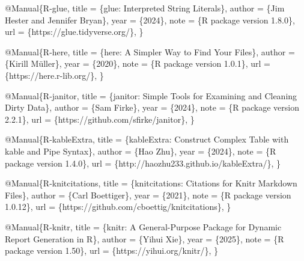 \documentclass[
]{article}
\newenvironment{Shaded}{\begin{snugshade}}{\end{snugshade}}
\newcommand{\DataTypeTok}[1]{\textcolor[rgb]{0.13,0.29,0.53}{#1}}
\newcommand{\NormalTok}[1]{#1}
\newcommand{\OtherTok}[1]{\textcolor[rgb]{0.56,0.35,0.01}{#1}}
\newcommand{\VariableTok}[1]{\textcolor[rgb]{0.00,0.00,0.00}{#1}}
\begin{document}
\begin{Shaded}
\begin{Highlighting}[]
\VariableTok{@Manual}\NormalTok{\{}\OtherTok{R}\NormalTok{{-}}\OtherTok{glue}\NormalTok{,}
  \DataTypeTok{title}\NormalTok{ = \{glue: Interpreted String Literals\},}
  \DataTypeTok{author}\NormalTok{ = \{Jim Hester and Jennifer Bryan\},}
  \DataTypeTok{year}\NormalTok{ = \{2024\},}
  \DataTypeTok{note}\NormalTok{ = \{R package version 1.8.0\},}
  \DataTypeTok{url}\NormalTok{ = \{https://glue.tidyverse.org/\},}
\NormalTok{\}}

\VariableTok{@Manual}\NormalTok{\{}\OtherTok{R}\NormalTok{{-}}\OtherTok{here}\NormalTok{,}
  \DataTypeTok{title}\NormalTok{ = \{here: A Simpler Way to Find Your Files\},}
  \DataTypeTok{author}\NormalTok{ = \{Kirill Müller\},}
  \DataTypeTok{year}\NormalTok{ = \{2020\},}
  \DataTypeTok{note}\NormalTok{ = \{R package version 1.0.1\},}
  \DataTypeTok{url}\NormalTok{ = \{https://here.r{-}lib.org/\},}
\NormalTok{\}}

\VariableTok{@Manual}\NormalTok{\{}\OtherTok{R}\NormalTok{{-}}\OtherTok{janitor}\NormalTok{,}
  \DataTypeTok{title}\NormalTok{ = \{janitor: Simple Tools for Examining and Cleaning Dirty Data\},}
  \DataTypeTok{author}\NormalTok{ = \{Sam Firke\},}
  \DataTypeTok{year}\NormalTok{ = \{2024\},}
  \DataTypeTok{note}\NormalTok{ = \{R package version 2.2.1\},}
  \DataTypeTok{url}\NormalTok{ = \{https://github.com/sfirke/janitor\},}
\NormalTok{\}}

\VariableTok{@Manual}\NormalTok{\{}\OtherTok{R}\NormalTok{{-}}\OtherTok{kableExtra}\NormalTok{,}
  \DataTypeTok{title}\NormalTok{ = \{kableExtra: Construct Complex Table with kable and Pipe Syntax\},}
  \DataTypeTok{author}\NormalTok{ = \{Hao Zhu\},}
  \DataTypeTok{year}\NormalTok{ = \{2024\},}
  \DataTypeTok{note}\NormalTok{ = \{R package version 1.4.0\},}
  \DataTypeTok{url}\NormalTok{ = \{http://haozhu233.github.io/kableExtra/\},}
\NormalTok{\}}

\VariableTok{@Manual}\NormalTok{\{}\OtherTok{R}\NormalTok{{-}}\OtherTok{knitcitations}\NormalTok{,}
  \DataTypeTok{title}\NormalTok{ = \{knitcitations: Citations for Knitr Markdown Files\},}
  \DataTypeTok{author}\NormalTok{ = \{Carl Boettiger\},}
  \DataTypeTok{year}\NormalTok{ = \{2021\},}
  \DataTypeTok{note}\NormalTok{ = \{R package version 1.0.12\},}
  \DataTypeTok{url}\NormalTok{ = \{https://github.com/cboettig/knitcitations\},}
\NormalTok{\}}

\VariableTok{@Manual}\NormalTok{\{}\OtherTok{R}\NormalTok{{-}}\OtherTok{knitr}\NormalTok{,}
  \DataTypeTok{title}\NormalTok{ = \{knitr: A General{-}Purpose Package for Dynamic Report Generation in R\},}
  \DataTypeTok{author}\NormalTok{ = \{Yihui Xie\},}
  \DataTypeTok{year}\NormalTok{ = \{2025\},}
  \DataTypeTok{note}\NormalTok{ = \{R package version 1.50\},}
  \DataTypeTok{url}\NormalTok{ = \{https://yihui.org/knitr/\},}
\NormalTok{\}}


\end{Highlighting}
\end{Shaded}
\end{document}

